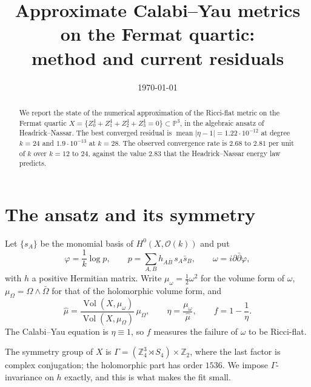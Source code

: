 \documentclass[11pt,a4paper]{article}
\title{Approximate Calabi--Yau metrics on the Fermat quartic:\\
       method and current residuals}
\author{}
\date{\today}
\newcommand{\PP}{\mathbb{P}}
\newcommand{\Z}{\mathbb{Z}}
\newcommand{\Vol}{\operatorname{Vol}}
\begin{document}
\maketitle

\begin{abstract}
We report the state of the numerical approximation of the Ricci-flat metric on
the Fermat quartic $X=\{Z_0^4+Z_1^4+Z_2^4+Z_3^4=0\}\subset\PP^3$, in the
algebraic ansatz of Headrick--Nassar. The best converged residual is
$\operatorname{mean}|\eta-1|=1.22\cdot10^{-12}$ at degree $k=24$ and
$1.9\cdot10^{-13}$ at $k=28$. The observed convergence rate is $2.68$ to $2.81$
per unit of $k$ over $k=12$ to $24$, against the value $2.83$ that the
Headrick--Nassar energy law predicts.
\end{abstract}

\section{The ansatz and its symmetry}

Let $\{s_A\}$ be the monomial basis of $H^0(X,\mathcal{O}(k))$ and put
\begin{equation}
  \varphi=\frac1k\log p,
  \qquad
  p=\sum_{A,B}h_{A\bar B}\,s_A\bar s_B,
  \qquad
  \omega=i\partial\bar\partial\varphi ,
  \label{eq:ansatz}
\end{equation}
with $h$ a positive Hermitian matrix. Write
$\mu_\omega=\tfrac1{2}\omega^2$ for the volume form of $\omega$,
$\mu_\Omega=\Omega\wedge\bar\Omega$ for that of the holomorphic volume form, and
\begin{equation}
  \hat\mu=\frac{\Vol(X,\mu_\omega)}{\Vol(X,\mu_\Omega)}\,\mu_\Omega,
  \qquad
  \eta=\frac{\mu_\omega}{\hat\mu},
  \qquad
  f=1-\frac1\eta .
  \label{eq:eta}
\end{equation}
The Calabi--Yau equation is $\eta\equiv1$, so $f$ measures the failure of
$\omega$ to be Ricci-flat.

The symmetry group of $X$ is
$\Gamma=(\Z_4^3\rtimes S_4)\times\Z_2$, where the last factor is complex
conjugation; the holomorphic part has order $1536$. We impose $\Gamma$-invariance
on $h$ exactly, and this is what makes the fit small.
\end{document}
